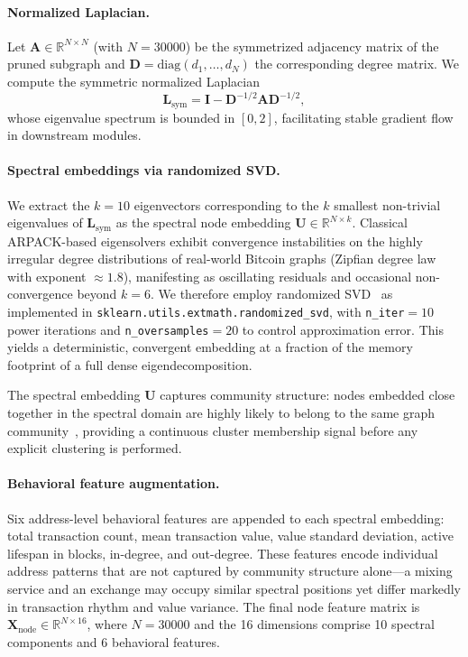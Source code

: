 \paragraph{Normalized Laplacian.}
Let $\mathbf{A} \in \mathbb{R}^{N \times N}$ (with $N = \num{30000}$) be the
symmetrized adjacency matrix of the pruned subgraph and
$\mathbf{D} = \mathrm{diag}(d_1, \ldots, d_N)$ the corresponding degree
matrix.
We compute the symmetric normalized Laplacian
\begin{equation}
  \mathbf{L}_{\mathrm{sym}}
    = \mathbf{I} - \mathbf{D}^{-1/2}\mathbf{A}\mathbf{D}^{-1/2},
  \label{eq:lsym}
\end{equation}
whose eigenvalue spectrum is bounded in $[0, 2]$, facilitating stable
gradient flow in downstream modules.

\paragraph{Spectral embeddings via randomized SVD.}
We extract the $k = 10$ eigenvectors corresponding to the $k$ smallest
non-trivial eigenvalues of $\mathbf{L}_{\mathrm{sym}}$ as the spectral node
embedding $\mathbf{U} \in \mathbb{R}^{N \times k}$.
Classical ARPACK-based eigensolvers exhibit convergence instabilities on the
highly irregular degree distributions of real-world Bitcoin graphs (Zipfian
degree law with exponent $\approx 1.8$), manifesting as oscillating residuals
and occasional non-convergence beyond $k = 6$.
We therefore employ randomized SVD~\cite{halko2011finding} as implemented in
\texttt{sklearn.utils.extmath.randomized\_svd}, with
\texttt{n\_iter}$= 10$ power iterations and
\texttt{n\_oversamples}$= 20$ to control approximation error.
This yields a deterministic, convergent embedding at a fraction of the memory
footprint of a full dense eigendecomposition.

The spectral embedding $\mathbf{U}$ captures community structure: nodes
embedded close together in the spectral domain are highly likely to belong
to the same graph community~\cite{luxburg2007tutorial}, providing a
continuous cluster membership signal before any explicit clustering is
performed.

\paragraph{Behavioral feature augmentation.}
Six address-level behavioral features are appended to each spectral embedding:
total transaction count, mean transaction value, value standard deviation,
active lifespan in blocks, in-degree, and out-degree.
These features encode individual address patterns that are not captured by
community structure alone—a mixing service and an exchange may occupy similar
spectral positions yet differ markedly in transaction rhythm and value
variance.
The final node feature matrix is
$\mathbf{X}_{\mathrm{node}} \in \mathbb{R}^{N \times 16}$,
where $N = \num{30000}$ and the 16 dimensions comprise 10 spectral
components and 6 behavioral features.

